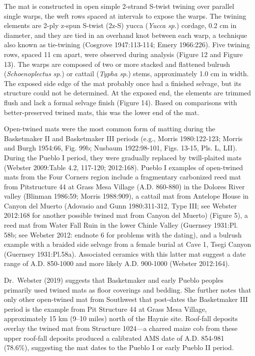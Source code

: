 \documentclass[
  12pt,
]{krantz}
\renewenvironment{quote}{\begin{VF}}{\end{VF}}
\begin{document}
\begin{quote}
The mat is constructed in open simple 2-strand S-twist twining over
parallel single warps, the weft rows spaced at intervals to expose the
warps. The twining elements are 2-ply z-spun S-twist (2z-S) yucca
(\emph{Yucca sp.}) cordage, 0.2 cm in diameter, and they are tied in an
overhand knot between each warp, a technique also known as tie-twining
(Cosgrove 1947:113-114; Emery 1966:226). Five twining rows, spaced 11
cm apart, were observed during analysis (Figure 12 and Figure 13). The
warps are composed of two or more stacked and flattened bulrush
(\emph{Schoenoplectus sp}.) or cattail (\emph{Typha sp}.) stems, approximately
1.0 cm in width. The exposed side edge of the mat probably once had a
finished selvage, but its structure could not be determined. At the
exposed end, the elements are trimmed flush and lack a formal selvage
finish (Figure 14). Based on comparisons with better-preserved twined
mats, this was the lower end of the mat.

Open-twined mats were the most common form of matting during the
Basketmaker II and Basketmaker III periods (e.g., Morris 1980:122-123;
Morris and Burgh 1954:66, Fig. 99b; Nusbaum 1922:98-101, Figs. 13-15,
Pls. L, LII). During the Pueblo I period, they were gradually replaced
by twill-plaited mats (Webster 2009:Table 4.2, 117-120; 2012:168).
Pueblo I examples of open-twined mats from the Four Corners region
include a fragmentary carbonized reed mat from Pitstructure 44 at
Grass Mesa Village (A.D. 860-880) in the Dolores River valley (Blinman
1986:59; Morris 1988:909), a cattail mat from Antelope House in Canyon
del Muerto (Adovasio and Gunn 1980:311-312, Type III; see Webster
2012:168 for another possible twined mat from Canyon del Muerto)
(Figure 5), a reed mat from Water Fall Ruin in the lower Chinle Valley
(Guernsey 1931:Pl. 58b; see Webster 2012: endnote 6 for problems with
the dating), and a bulrush example with a braided side selvage from a
female burial at Cave 1, Tsegi Canyon (Guernsey 1931:Pl.58a).
Associated ceramics with this latter mat suggest a date range of A.D.
850-1000 and more likely A.D. 900-1000 (Webster 2012:164).
\end{quote}

Dr.~Webster (2019) suggests that Basketmaker and early Pueblo peoples
primarily used twined mats as floor coverings and bedding. She further
notes that only other open-twined mat from Southwest that post-dates the
Basketmaker III period is the example from Pit Structure 44 at Grass
Mesa Village, approximately 15 km (9--10 miles) north of the Haynie
site. Roof-fall deposits overlay the twined mat from Structure 1024---a
charred maize cob from these upper roof-fall deposits produced a
calibrated AMS date of A.D. 854-981 (78.6\%), suggesting the mat dates to
the Pueblo I or early Pueblo II period.
\end{document}

